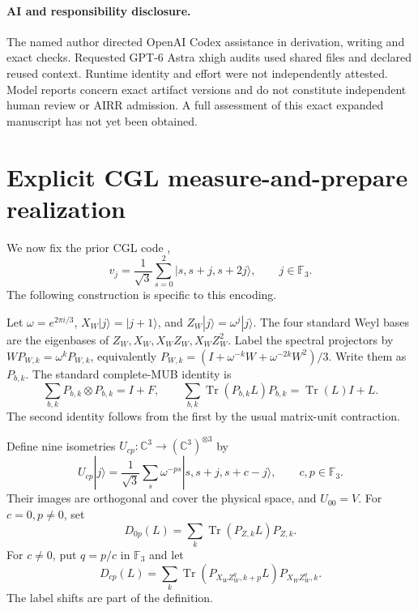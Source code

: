 \documentclass[11pt,a4paper]{article}
\newcommand{\Tr}{\operatorname{Tr}}
\newcommand{\C}{\mathbb C}
\begin{document}
\paragraph{AI and responsibility disclosure.}
The named author directed OpenAI Codex assistance in derivation, writing and exact checks. Requested GPT-6 Astra xhigh audits used shared files and declared reused context. Runtime identity and effort were not independently attested. Model reports concern exact artifact versions and do not constitute independent human review or AIRR admission. A full assessment of this exact expanded manuscript has not yet been obtained.

\appendix
\section{Explicit CGL measure-and-prepare realization}\label{app:CGL}

We now fix the prior CGL code \cite{CGL},
\begin{equation}\label{eq:CGL}
 v_j=\frac1{\sqrt3}\sum_{s=0}^2|s,s+j,s+2j\rangle ,
 \qquad j\in\mathbb F_3.
\end{equation}
The following construction is specific to this encoding.

Let \(\omega=e^{2\pi i/3}\), \(X_W|j\rangle=|j+1\rangle\), and
\(Z_W|j\rangle=\omega^j|j\rangle\). The four standard Weyl bases are the eigenbases of \(Z_W,X_W,X_WZ_W,X_WZ_W^2\). Label the spectral projectors by \(W P_{W,k}=\omega^kP_{W,k}\), equivalently \(P_{W,k}=(I+\omega^{-k}W+\omega^{-2k}W^2)/3\). Write them as \(P_{b,k}\). The standard complete-MUB identity \cite{MUB} is
\begin{equation}\label{eq:MUB}
 \sum_{b,k}P_{b,k}\otimes P_{b,k}=I+F,\qquad
 \sum_{b,k}\Tr(P_{b,k}L)P_{b,k}=\Tr(L)I+L .
\end{equation}
The second identity follows from the first by the usual matrix-unit contraction.

Define nine isometries \(U_{cp}:\C^3\to(\C^3)^{\otimes3}\) by
\[
 U_{cp}|j\rangle=\frac1{\sqrt3}\sum_s
   \omega^{-ps}|s,s+j,s+c-j\rangle,\qquad c,p\in\mathbb F_3.
\]
Their images are orthogonal and cover the physical space, and \(U_{00}=V\).
For \(c=0,p\ne0\), set
\[
 D_{0p}(L)=\sum_k\Tr(P_{Z,k}L)P_{Z,k}.
\]
For \(c\ne0\), put \(q=p/c\) in \(\mathbb F_3\) and let
\[
 D_{cp}(L)=\sum_k\Tr(P_{X_WZ_W^q,k+p}L)P_{X_WZ_W^q,k}.
\]
The label shifts are part of the definition.
\end{document}
